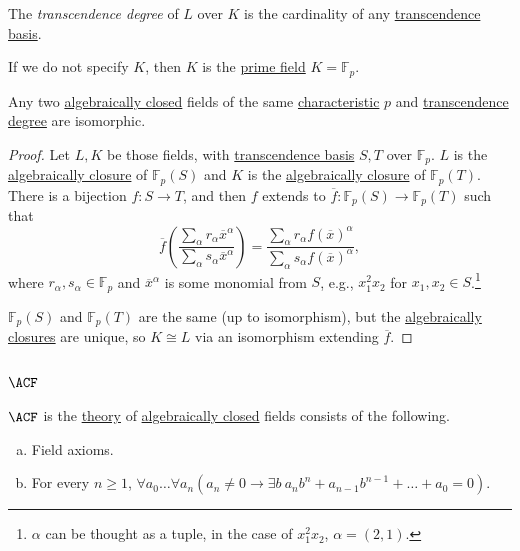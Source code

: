 \begin{definition}\label{def:transcendence-degree}
	The \emph{transcendence degree} of \(L\) over \(K\) is the cardinality of any \hyperref[def:transcendence-basis]{transcendence basis}.
\end{definition}

If we do not specify \(K\), then \(K\) is the \hyperref[def:prime-field]{prime field} \(K = \mathbb{F} _p\).

\begin{theorem}\label{thm:same-transcendence-degree-isomorphic}
	Any two \hyperref[def:algebraically-closed]{algebraically closed} fields of the same \hyperref[def:characteristic]{characteristic} \(p\) and \hyperref[def:transcendence-degree]{transcendence degree} are isomorphic.
\end{theorem}
\begin{proof}
	Let \(L, K\) be those fields, with \hyperref[def:transcendence-basis]{transcendence basis} \(S, T\) over \(\mathbb{F} _p\). \(L\) is the \hyperref[def:algebraically-closure]{algebraically closure} of \(\mathbb{F} _p(S)\) and \(K\) is the \hyperref[def:algebraically-closure]{algebraically closure} of \(\mathbb{F} _p(T)\). There is a bijection \(f\colon S\to T\), and then \(f\) extends to \(\overline{f} \colon \mathbb{F} _p(S) \to \mathbb{F} _p(T)\) such that
	\[
		\overline{f} \left( \frac{\sum_{\alpha } r_\alpha \overline{x} ^\alpha }{\sum_{\alpha }s_\alpha \overline{x} ^\alpha  } \right)
		= \frac{\sum_{\alpha } r_\alpha f(\overline{x} )^\alpha }{\sum_{\alpha } s_\alpha f(\overline{x} )^\alpha },
	\]
	where \(r_\alpha , s_\alpha \in \mathbb{F} _p\) and \(\overline{x} ^\alpha \) is some monomial from \(S\), e.g., \(x_1^2 x_2\) for \(x_1, x_2\in S\).\footnote{\(\alpha \) can be thought as a tuple, in the case of \(x_1^2 x_2\), \(\alpha = (2, 1)\).}

	\(\mathbb{F} _p(S)\) and \(\mathbb{F} _p(T)\) are the same (up to isomorphism), but the \hyperref[def:algebraically-closure]{algebraically closures} are unique, so \(K \cong L\) via an isomorphism extending \(\overline{f} \).
\end{proof}

\subsection{\(\ACF\)}
\begin{definition}[\(\ACF\)]\label{def:ACF}
	\(\ACF\) is the \hyperref[def:theory]{theory} of \hyperref[def:algebraically-closed]{algebraically closed} fields consists of the following.
	\begin{enumerate}[(a)]
		\item Field axioms.
		\item For every \(n \geq 1\), \(\forall a_0 \ldots \forall a_n \left( a_n \neq 0 \to \exists b\ a_n b^n + a_{n-1} b^{n-1} + \ldots + a_0 = 0\right) \).
	\end{enumerate}
\end{definition}

